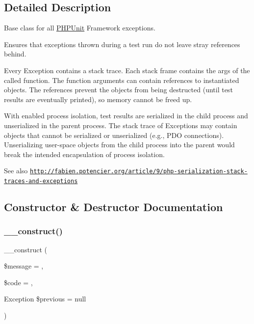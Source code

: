 \subsection{Detailed Description}
Base class for all \mbox{\hyperlink{namespace_p_h_p_unit}{P\+H\+P\+Unit}} Framework exceptions.

Ensures that exceptions thrown during a test run do not leave stray references behind.

Every Exception contains a stack trace. Each stack frame contains the \textquotesingle{}args\textquotesingle{} of the called function. The function arguments can contain references to instantiated objects. The references prevent the objects from being destructed (until test results are eventually printed), so memory cannot be freed up.

With enabled process isolation, test results are serialized in the child process and unserialized in the parent process. The stack trace of Exceptions may contain objects that cannot be serialized or unserialized (e.\+g., P\+DO connections). Unserializing user-\/space objects from the child process into the parent would break the intended encapsulation of process isolation.

\begin{DoxySeeAlso}{See also}
\href{http://fabien.potencier.org/article/9/php-serialization-stack-traces-and-exceptions}{\tt http\+://fabien.\+potencier.\+org/article/9/php-\/serialization-\/stack-\/traces-\/and-\/exceptions} 
\end{DoxySeeAlso}


\subsection{Constructor \& Destructor Documentation}
\mbox{\label{class_p_h_p_unit___framework___exception_a7e221b41646f3a7dfa4df1dbd5f022e7}} 
\subsubsection{\texorpdfstring{\+\_\+\+\_\+construct()}{\_\_construct()}}
{\footnotesize\ttfamily \+\_\+\+\_\+construct (\begin{DoxyParamCaption}\item[{}]{\$message = {\ttfamily \textquotesingle{}\textquotesingle{}},  }\item[{}]{\$code = {},  }\item[{Exception}]{\$previous = {\ttfamily null} }\end{DoxyParamCaption})}



